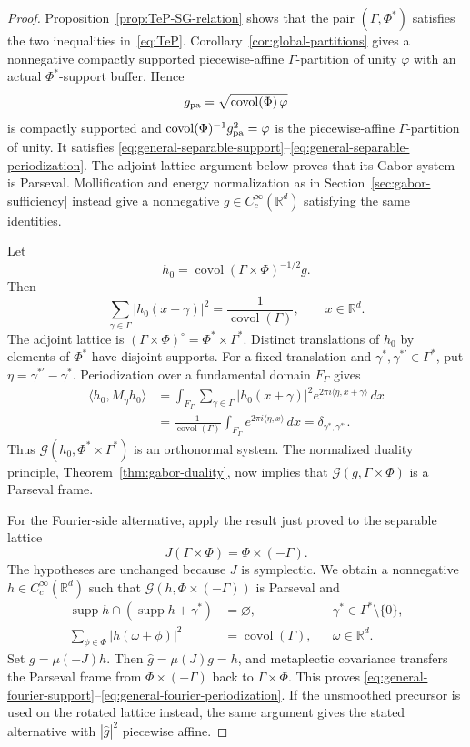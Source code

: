 \documentclass[11pt,reqno]{amsart}
\numberwithin{equation}{section}
\theoremstyle{definition}
\theoremstyle{remark}
\newcommand{\R}{\mathbb R}
\newcommand{\covol}{\operatorname{covol}}
\newcommand{\supp}{\operatorname{supp}}
\newcommand{\G}{\mathcal G}
\newcommand{\ip}[2]{\langle #1,#2\rangle}
\begin{document}
\begin{proof}
Proposition~\ref{prop:TeP-SG-relation} shows that the pair
$(\Gamma,\Phi^*)$ satisfies the two inequalities in~\eqref{eq:TeP}.
Corollary~\ref{cor:global-partitions} gives a nonnegative compactly
supported piecewise-affine $\Gamma$-partition of unity $\varphi$ with an
actual $\Phi^*$-support buffer.  Hence
\[
 g_{\rm pa}=\sqrt{\covol(\Phi)\,\varphi}
\]
is compactly supported and
$\covol(\Phi)^{-1}g_{\rm pa}^2=\varphi$ is the piecewise-affine
$\Gamma$-partition of unity.  It satisfies
\eqref{eq:general-separable-support}--\eqref{eq:general-separable-periodization}.
The adjoint-lattice argument below proves that its Gabor system is Parseval.
Mollification and energy normalization as in
Section~\ref{sec:gabor-sufficiency} instead give a nonnegative
$g\in C_c^\infty(\R^d)$ satisfying the same identities.

Let
\[
 h_0=\covol(\Gamma\times\Phi)^{-1/2}g.
\]
Then
\[
 \sum_{\gamma\in\Gamma}|h_0(x+\gamma)|^2
 =\frac{1}{\covol(\Gamma)},
 \qquad x\in\R^d.
\]
The adjoint lattice is
$(\Gamma\times\Phi)^\circ=\Phi^*\times\Gamma^*$.
Distinct translations of $h_0$ by elements of $\Phi^*$ have disjoint
supports.  For a fixed translation and
$\gamma^*,\gamma^{*\prime}\in\Gamma^*$, put
$\eta=\gamma^{*\prime}-\gamma^*$.  Periodization over a fundamental
domain $F_\Gamma$ gives
\[
 \begin{aligned}
 \ip{h_0}{M_\eta h_0}
 &=\int_{F_\Gamma}
   \sum_{\gamma\in\Gamma}|h_0(x+\gamma)|^2
   e^{2\pi i\ip{\eta}{x+\gamma}}\,dx\\
 &=\frac1{\covol(\Gamma)}
   \int_{F_\Gamma}e^{2\pi i\ip{\eta}{x}}\,dx
 =\delta_{\gamma^*,\gamma^{*\prime}}.
 \end{aligned}
\]
Thus
$\G(h_0,\Phi^*\times\Gamma^*)$ is an orthonormal system.  The normalized
duality principle, Theorem~\ref{thm:gabor-duality}, now implies that
$\G(g,\Gamma\times\Phi)$ is a Parseval frame.

For the Fourier-side alternative, apply the result just proved to the
separable lattice
\[
 J(\Gamma\times\Phi)=\Phi\times(-\Gamma).
\]
The hypotheses are unchanged because $J$ is symplectic.  We obtain a
nonnegative $h\in C_c^\infty(\R^d)$ such that
$\G(h,\Phi\times(-\Gamma))$ is Parseval and
\begin{align*}
 \supp h\cap(\supp h+\gamma^*)&=\varnothing,
 &&\gamma^*\in\Gamma^*\setminus\{0\},\\
 \sum_{\phi\in\Phi}|h(\omega+\phi)|^2&=\covol(\Gamma),
 &&\omega\in\R^d.
\end{align*}
Set $g=\mu(-J)h$.  Then $\widehat g=\mu(J)g=h$, and metaplectic
covariance transfers the Parseval frame from
$\Phi\times(-\Gamma)$ back to $\Gamma\times\Phi$.  This proves
\eqref{eq:general-fourier-support}--\eqref{eq:general-fourier-periodization}.
If the unsmoothed precursor is used on the rotated lattice instead, the same
argument gives the stated alternative with $|\widehat g|^2$ piecewise
affine.
\end{proof}
\end{document}
